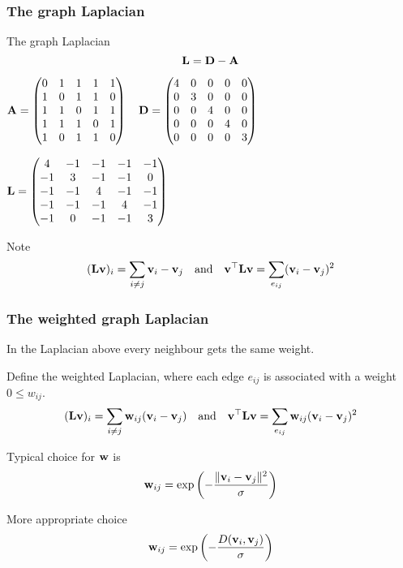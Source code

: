 \documentclass[12pt,fleqn]{beamer}
\begin{document}
\begin{frame}
\frametitle{The graph Laplacian }

The graph Laplacian
$$ {{\bf L}} = {{\bf D}}   - {\bf A} $$ 

$ {\bf A} = \begin{pmatrix} 0 & 1 & 1 & 1 & 1 \\
                                        1 & 0 & 1 & 1 & 0 \\
                                        1 & 1 & 0 & 1 & 1 \\
                                        1 & 1 & 1 & 0 & 1 \\
                                        1 & 0 & 1 & 1 & 0 \end{pmatrix}  \quad
   {\bf D} = \begin{pmatrix} 4 & 0 & 0 & 0 & 0 \\
                                        0 & 3 & 0 & 0 & 0 \\
                                        0 & 0 & 4 & 0 & 0 \\
                                        0 & 0 & 0 & 4 & 0 \\
                                        0 & 0 & 0 & 0 & 3 \end{pmatrix} 
                                        $

\bigskip

$ {\bf L} = \begin{pmatrix} 4 & -1 & -1 & -1 & -1 \\
                                        -1 & 3 & -1 & -1 & 0 \\
                                        -1 & -1 & 4 & -1 & -1 \\
                                        -1 & -1 & -1 & 4 & -1 \\
                                        -1 & 0 & -1 & -1 & 3 \end{pmatrix}  $

Note
$$ ({\bf L} {\bf v})_i =  \sum_{i\not=j}  {\bf v}_i - {\bf v}_j \quad {\rm and} \quad {\bf v}^{\top}{\bf L} {\bf v} =  \sum_{e_{ij}}  ({\bf v}_i - {\bf v}_j)^2$$

\end{frame}

\begin{frame}
\frametitle{The weighted graph Laplacian }

In the Laplacian above every neighbour gets the same weight.

Define the weighted Laplacian, where each edge $e_{ij}$ is associated with a weight $0 \le w_{ij} $.
$$ ({\bf L} {\bf v})_i =  \sum_{i\not=j}  {\bf w}_{ij}({\bf v}_i - {\bf v}_j) \quad {\rm and} \quad {\bf v}^{\top}{\bf L} {\bf v} =  \sum_{e_{ij}} {\bf w}_{ij} ({\bf v}_i - {\bf v}_j)^2$$

Typical choice for ${\bf w}$ is
$$ {\bf w}_{ij} = \exp\left(-{\frac {\|{\bf v}_i - {\bf v}_j\|^2}{\sigma}} \right) $$

More appropriate choice
$$ {\bf w}_{ij} = \exp\left(-{\frac {D({\bf v}_i,{\bf v}_j)}{\sigma}} \right) $$

\end{frame}
\end{document}
